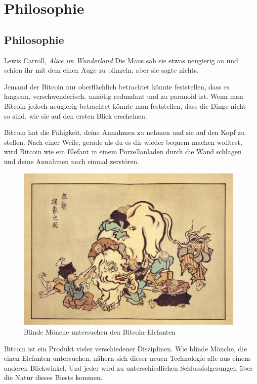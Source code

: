 \part{Philosophie}
\label{ch:philosophy}
\chapter*{Philosophie}

\begin{chapquote}{Lewis Carroll, \textit{Alice im Wunderland}}
Die Maus sah sie etwas neugierig an und schien ihr mit dem einen Auge zu
blinzeln; aber sie sagte nichts.
\end{chapquote}

Jemand der Bitcoin nur oberflächlich betrachtet könnte feststellen, dass es
langsam, verschwenderisch, unnötig redundant und zu paranoid ist. Wenn man
Bitcoin jedoch neugierig betrachtet könnte man feststellen, dass die Dinge nicht
so sind, wie sie auf den ersten Blick erscheinen.

Bitcoin hat die Fähigkeit, deine Annahmen zu nehmen und sie auf den Kopf zu
stellen. Nach einer Weile, gerade als du es dir wieder bequem machen wolltest,
wird Bitcoin wie ein Elefant in einem Porzellanladen durch die Wand schlagen und
deine Annahmen noch einmal zerstören.

\begin{figure}
  \includegraphics{assets/images/blind-monks.jpg}
  \caption{Blinde Mönche untersuchen den Bitcoin-Elefanten}
  \label{fig:blind-monks}
\end{figure}

Bitcoin ist ein Produkt vieler verschiedener Disziplinen. Wie blinde Mönche, die
einen Elefanten untersuchen, nähern sich dieser neuen Technologie alle aus einem
anderen Blickwinkel. Und jeder wird zu unterschiedlichen Schlussfolgerungen über
die Natur dieses Biests kommen.

